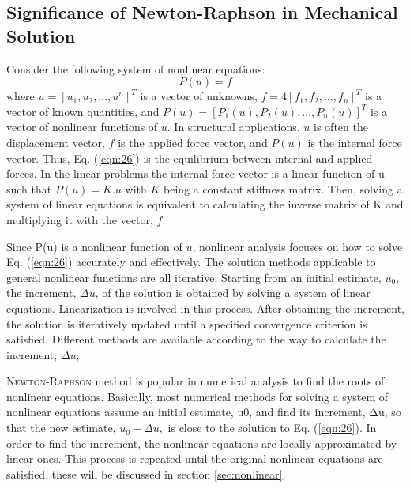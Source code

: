 \subsection{Significance of Newton-Raphson in Mechanical Solution }
Consider the following system of nonlinear equations:
\begin{equation}
\label{eqn:26}
    P(u)=f
\end{equation}
where $u = [u_1, u_2,\ldots,u^n]^T$ is a vector of unknowns, $f=4 [f_1, f_2,\ldots , f_n]^T$ is a vector of known quantities, and $P(u)= [P_1(u), P_2(u),\ldots, P_n(u)]^T$ is a vector of nonlinear
functions of $u$. In structural applications, $u$ is often the displacement vector, $f$ is the
applied force vector, and $P(u)$ is the internal force vector. Thus, Eq. (\ref{eqn:26}) is the
equilibrium between internal and applied forces. In the linear problems 
the internal force vector is a linear function of u such that $P(u)=K.u$ with $K$ being
a constant stiffness matrix. Then, solving a system of linear equations is equivalent
to calculating the inverse matrix of K and multiplying it with the vector,
$f$. 

Since P(u) is a nonlinear function of $u$, nonlinear analysis focuses on how to solve Eq. (\ref{eqn:26}) accurately and effectively. The solution methods applicable to general nonlinear functions are all iterative. Starting from an initial estimate, $u_0$, the increment, $\Delta u$, of the solution is obtained by solving a system of linear equations. Linearization is involved in this process. After obtaining the increment, the solution is iteratively updated until a specified convergence criterion is satisfied. Different methods are available according to the way to calculate the increment,
$\Delta u$; 

\textsc{Newton-Raphson} method is popular in numerical analysis to find the roots of nonlinear
equations. Basically, most numerical methods for solving a system of nonlinear
equations assume an initial estimate, u0, and find its increment, Δu, so that the
new estimate, $u_0 + \Delta u,$ is close to the solution to Eq. (\ref{eqn:26}). In order to find the increment, the nonlinear equations are locally approximated by linear ones. This process is repeated until the original nonlinear equations are satisfied. these will be discussed in section \ref{sec:nonlinear}.

